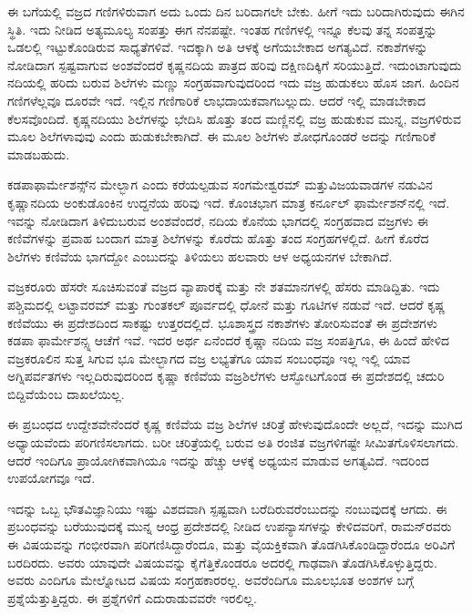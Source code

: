 \newpage

ಈ ಬಗೆಯಲ್ಲಿ ವಜ್ರದ ಗಣಿಗಳಿರುವಾಗ ಅದು ಒಂದು ದಿನ ಬರಿದಾಗಲೇ ಬೇಕು. ಹೀಗೆ ಇದು ಬರಿದಾಗಿರುವುದು ಈಗಿನ ಸ್ಥಿತಿ. ಇದು ನೀಡಿದ ಅತ್ಯಮೂಲ್ಯ ಸಂಪತ್ತು ಈಗ ನೆನಪಷ್ಟೇ. ಇಂತಹ ಗಣಿಗಳಲ್ಲಿ ಇನ್ನೂ ಕೆಲವು ತನ್ನ ಸಂಪತ್ತನ್ನು ಒಡಲಲ್ಲಿ ಇಟ್ಟುಕೊಂಡಿರುವ ಸಾಧ್ಯತೆಗಳಿವೆ. ಇದಕ್ಕಾಗಿ ಅತಿ ಆಳಕ್ಕೆ ಅಗೆಯಬೇಕಾದ ಅಗತ್ಯವಿದೆ. ನಕಾಶೆಗಳನ್ನು ನೋಡಿದಾಗ ಸ್ಪಷ್ಟವಾಗುವ ಅಂಶವೆಂದರೆ ಕೃಷ್ಣನದಿಯ ಪಾತ್ರದ ಹರಿವು ದಕ್ಷಿಣದಿಕ್ಕಿಗೆ ಸರಿಯುತ್ತಿದೆ. ಇದುಂಟಾಗುವುದು ನದಿಯಲ್ಲಿ ಹರಿದು ಬರುವ ಶಿಲೆಗಳು ಮಣ್ಣು ಸಂಗ್ರಹವಾಗುವುದರಿಂದ ಇದು ವಜ್ರ ಹುಡುಕಲು ಹೊಸ ಜಾಗ. ಹಿಂದಿನ ಗಣಿಗಳೆಲ್ಲವೂ ದೂರವೇ ಇದೆ. ಇಲ್ಲಿನ ಗಣಿಗಾರಿಕೆ ಲಾಭದಾಯಕವಾಗಬಲ್ಲುದು. ಆದರೆ ಇಲ್ಲಿ ಮಾಡಬೇಕಾದ ಕೆಲಸವೊಂದಿದೆ. ಕೃಷ್ಣನದಿಯು ಶಿಲೆಗಳನ್ನು ಭೇದಿಸಿ ಹೊತ್ತು ತಂದ ಮಣ್ಣಿನಲ್ಲಿ ವಜ್ರ ಹುಡುಕುವ ಮುನ್ನ, ವಜ್ರಗಳಿರುವ ಮೂಲ ಶಿಲೆಗಳಾವುವು ಎಂದು ಹುಡುಕಬೇಕಾಗಿದೆ. ಈ ಮೂಲ ಶಿಲೆಗಳು ಶೋಧಗೊಂಡರೆ ಅದನ್ನು ಗಣಿಗಾರಿಕೆ ಮಾಡಬಹುದು. 

ಕಡಪಾಫಾರ್ಮೇಶನ್ಸ್‌ನ ಮೇಲ್ಭಾಗ ಎಂದು ಕರೆಯಲ್ಪಡುವ ಸಂಗಮೇಶ್ವರಮ್ ಮತ್ತು\break ವಿಜಯವಾಡಗಳ ನಡುವಿನ ಕೃಷ್ಣಾನದಿಯ ಅಂಕುಡೊಂಕಿನ ಉದ್ದನೆಯ ಹರಿವು ಇದೆ. ಕೊಂಚಭಾಗ ಮಾತ್ರ ಕರ್ನೂಲ್ ಫಾರ್ಮೇಶನ್‌ನಲ್ಲಿ ಇದೆ. ಇವನ್ನು ನೋಡಿದಾಗ ತಿಳಿದುಬರುವ ಅಂಶವೆಂದರೆ, ನದಿಯ ಕೊನೆಯ ಭಾಗದಲ್ಲಿ ಸಂಗ್ರಹವಾದ ವಜ್ರಗಳು ಈ ಕಣಿವೆಗಳನ್ನು ಪ್ರವಾಹ ಬಂದಾಗ ಮಾತ್ರ ಶಿಲೆಗಳನ್ನು ಕೊರೆದು ಹೊತ್ತು ತಂದ ಸಂಗ್ರಹಗಳಲ್ಲಿದೆ. ಹೀಗೆ ಕೊರೆದ ಶಿಲೆಗಳು ಕಣಿವೆಯ ಭಾಗದ್ದೋ ಎಂಬುದನ್ನು ತಿಳಿಯಲು ಹಲವಾರು ಆಳ ಅಧ್ಯಯನಗಳ ಬೇಕಾಗಿದೆ.

ವಜ್ರಕರೂರು ಹೆಸರೇ ಸೂಚಿಸುವಂತೆ ವಜ್ರದ ವ್ಯಾಪಾರಕ್ಕೆ  ಮತ್ತು  ನೇ ಶತಮಾನಗಳಲ್ಲಿ ಹೆಸರು ಮಾಡಿದ್ದಿತು. ಇದು ಪಶ್ಚಿಮದಲ್ಲಿ ಲಟ್ಟಾವರಮ್ ಮತ್ತು ಗುಂತಕಲ್ ಪೂರ್ವದಲ್ಲಿ ಧೋನೆ ಮತ್ತು ಗೂಟಿಗಳ ನಡುವೆ ಇದೆ. ಆದರೆ ಕೃಷ್ಣ ಕಣಿವೆಯು ಈ ಪ್ರದೇಶದಿಂದ ಸಾಕಷ್ಟು ಉತ್ತರದಲ್ಲಿದೆ. ಭೂಶಾಸ್ತ್ರದ ನಕಾಶೆಗಳು ತೋರಿಸುವಂತೆ ಈ ಪ್ರದೇಶಗಳು ಕಡಪಾ ಫಾರ್ಮೇಶನ್ಸ್ನ ಆಚೆಗೆ ಇವೆ. ಇದರ ಅರ್ಥ ಏನೆಂದರೆ ಕೃಷ್ಣಾ ನದಿಯ ವಜ್ರ ಸಂಪತ್ತಿಗೂ, ಈ ಹಿಂದೆ ಹೇಳಿದ ವಜ್ರಕರೂಲಿನ ಸುತ್ತ ಸಿಗುವ ಭೂ ಮೇಲ್ಭಾಗದ ವಜ್ರ ಲಭ್ಯತೆಗೂ ಯಾವ ಸಂಬಂಧವೂ ಇಲ್ಲ ಇಲ್ಲಿ ಯಾವ ಅಗ್ನಿಪರ್ವತಗಳು ಇಲ್ಲದಿರುವುದರಿಂದ ಕೃಷ್ಣಾ ಕಣಿವೆಯ ವಜ್ರಶಿಲೆಗಳು ಆಸ್ಫೋಟಗೊಂಡ ಈ ಪ್ರದೇಶದಲ್ಲಿ ಚದುರಿ ಬಿದ್ದಿವೆಯೆಂಬ ದಾಖಲೆಯಿಲ್ಲ.

ಈ ಪ್ರಬಂಧದ ಉದ್ದೇಶವೇನೆಂದರೆ ಕೃಷ್ಣ ಕಣಿವೆಯ ವಜ್ರ ಶಿಲೆಗಳ ಚರಿತ್ರೆ ಹೇಳುವುದೊಂದೇ ಅಲ್ಲದೆ, ಇದನ್ನು ಮುಗಿದ ಅಧ್ಯಾಯವೆಂದು ಪರಿಗಣಿಸಲಾಗದು. ಬರೀ ಚರಿತ್ರೆಯಲ್ಲಿ ಬರುವ ಅತಿ ರಂಜಿತ ವಜ್ರಗಳಿಗಷ್ಟೇ ಸೀಮಿತಗೊಳಿಸಲಾಗದು. ಆದರೆ ಇಂದಿಗೂ ಪ್ರಾಯೋಗಿಕವಾಗಿಯೂ ಇದನ್ನು ಹೆಚ್ಚು ಆಳಕ್ಕೆ ಅಧ್ಯಯನ ಮಾಡುವ ಅಗತ್ಯವಿದೆ. ಇದರಿಂದ ಉಪಯೋಗವೂ ಇದೆ.

ಇದನ್ನು ಒಬ್ಬ ಭೌತವಿಜ್ಞಾನಿಯು ಇಷ್ಟು ವಿಶದವಾಗಿ ಸ್ಪಷ್ಟವಾಗಿ ಬರೆದಿರುವರೆಂಬುದನ್ನು ನಂಬುವುದಕ್ಕೆ ಆಗದು. ಈ ಪ್ರಬಂಧವನ್ನು ಬರೆಯುವುದಕ್ಕೆ ಮುನ್ನ ಆಂಧ್ರ ಪ್ರದೇಶದಲ್ಲಿ ನೀಡಿದ ಉಪನ್ಯಾಸಗಳನ್ನು ಕೇಳಿದವರಿಗೆ, ರಾಮನ್‌ರವರು ಈ ವಿಷಯವನ್ನು ಗಂಭೀರವಾಗಿ ಪರಿಗಣಿಸಿದ್ದಾರೆಂದೂ, ಮತ್ತು ವೈಯಕ್ತಿಕವಾಗಿ ತೊಡಗಿಸಿಕೊಂಡಿದ್ದಾರೆಂದೂ ಅರಿವಿಗೆ ಬರದಿರದು. ಅವರು ಯಾವುದೇ ವಿಷಯವನ್ನು ಕೈಗೆತ್ತಿಕೊಂಡರೂ ಅದರಲ್ಲಿ ಗಾಢವಾಗಿ ತೊಡಗಿಸಿಕೊಳ್ಳುತ್ತಿದ್ದರು. ಅವರು ಎಂದಿಗೂ ಮೇಲ್ನೋಟದ ವಿಷಯ ಸಂಗ್ರಹಕಾರರಲ್ಲ. ಅವರೆಂದಿಗೂ ಮೂಲಭೂತ ಅಂಶಗಳ ಬಗ್ಗೆ ಪ್ರಶ್ನೆಯೆತ್ತುತ್ತಿದ್ದರು. ಈ ಪ್ರಶ್ನೆಗಳಿಗೆ ಎದುರಾಡುವವರೇ ಇರಲಿಲ್ಲ.

